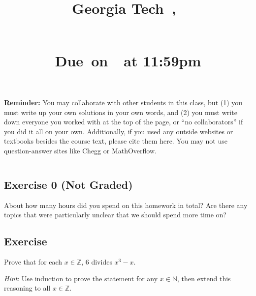 \documentclass{article}
\title{
    \hmwkTitle \\
    \vspace{0.1in}\large{Georgia Tech\ \hmwkClass,\ \hmwkSection}
    \author{\large{\hmwkAuthorName}} \\
    \vspace{0.2in}
    \small{Due\ on\ \hmwkDueDate\ at 11:59pm}
    \date{}
}
\newcounter{counter}
\newcommand{\Exercise}{Exercise \stepcounter{counter}\thecounter}
\begin{document}
\maketitle

\textbf{Reminder:} You may collaborate with other students in this
class, but (1) you must write up your own solutions in your own words, and (2) you must write down everyone you worked with at the top of the page, or ``no collaborators'' if you did it all on your own. Additionally, if you used any outside websites or textbooks besides the course text, please cite them here. You may not use question-answer sites like Chegg or MathOverflow.

\vspace{5mm} \hrule

\subsection*{Exercise 0 (Not Graded)}
About how many hours did you spend on this homework in total? Are there any topics that were particularly unclear that we should spend more time on?

\subsection*{\Exercise}
    Prove that for each $x \in \mathbb{Z}$, 6 divides $x^3 - x$.
    
    \vspace{1.5mm}
    {\small \textit{Hint}: Use induction to prove the statement for any $x \in \mathbb{N}$, then extend this reasoning to all $x \in \mathbb{Z}$.}
\end{document}
